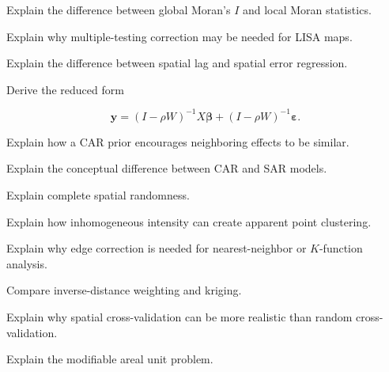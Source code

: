 \begin{exercise}[3]
Explain the difference between global Moran's \(I\) and local Moran
statistics.
\end{exercise}

\begin{exercise}[3]
Explain why multiple-testing correction may be needed for LISA maps.
\end{exercise}

\begin{exercise}[3]
Explain the difference between spatial lag and spatial error regression.
\end{exercise}

\begin{exercise}[3]
Derive the reduced form

\[
\mathbf{y}
=
(
I-\rho W
)^{-1}
X\boldsymbol{\beta}
+
(
I-\rho W
)^{-1}
\boldsymbol{\varepsilon}.
\]
\end{exercise}

\begin{exercise}[3]
Explain how a CAR prior encourages neighboring effects to be similar.
\end{exercise}

\begin{exercise}[3]
Explain the conceptual difference between CAR and SAR models.
\end{exercise}

\begin{exercise}[3]
Explain complete spatial randomness.
\end{exercise}

\begin{exercise}[3]
Explain how inhomogeneous intensity can create apparent point clustering.
\end{exercise}

\begin{exercise}[3]
Explain why edge correction is needed for nearest-neighbor or
\(K\)-function analysis.
\end{exercise}

\begin{exercise}[3]
Compare inverse-distance weighting and kriging.
\end{exercise}

\begin{exercise}[3]
Explain why spatial cross-validation can be more realistic than random
cross-validation.
\end{exercise}

\begin{exercise}[3]
Explain the modifiable areal unit problem.
\end{exercise}

